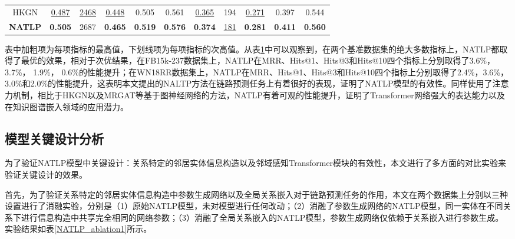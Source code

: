 \begin{table}[htbp]
\begin{center}
\begin{tabular}{*{11}{c}}
          HKGN&\underline{0.487}&\underline{2468}&\underline{0.448}&0.505&0.561&\underline{0.365}&194&\underline{0.271}&0.397&0.544\\
          \cmidrule{1-11}
          \textbf{NATLP}&\textbf{0.505}&2687&\textbf{0.465}&\textbf{0.519}&\textbf{0.576}&\textbf{0.374}&\underline{181}&\textbf{0.281}&\textbf{0.411}&\textbf{0.560}\\
          \bottomrule
      \end{tabular}
      \label{NATLP_result_tab}
  \end{center}
\end{table}

表中加粗项为每项指标的最高值，下划线项为每项指标的次高值。从表\ref{NATLP_result_tab}中可以观察到，在两个基准数据集的绝大多数指标上，NATLP都取得了最优的效果，相对于次优结果，在FB15k-237数据集上，NATLP在MRR、Hits@1、Hits@3和Hits@10四个指标上分别取得了3.6\%，3.7\%， 1.9\%， 0.6\%的性能提升；在WN18RR数据集上，NATLP在MRR、Hits@1、Hits@3和Hits@10四个指标上分别取得了2.4\%，3.6\%， 3.0\%和2.0\%的性能提升，这表明本文提出的NALTP方法在链路预测任务上有着很好的表现，证明了NATLP模型的有效性。同样使用了注意力机制，相比于HKGN以及MRGAT等基于图神经网络的方法，NATLP有着可观的性能提升，证明了Transformer网络强大的表达能力以及在知识图谱嵌入领域的应用潜力。

\subsection{模型关键设计分析}

为了验证NATLP模型中关键设计：关系特定的邻居实体信息构造以及邻域感知Transformer模块的有效性，本文进行了多方面的对比实验来验证关键设计的效果。

首先，为了验证关系特定的邻居实体信息构造中参数生成网络以及全局关系嵌入对于链路预测任务的作用，本文在两个数据集上分别以三种设置进行了消融实验，分别是（1）原始NATLP模型，未对模型进行任何改动；（2）消融了参数生成网络的NATLP模型，同一实体在不同关系下进行信息构造中共享完全相同的网络参数；（3）消融了全局关系嵌入的NATLP模型，参数生成网络仅依赖于关系嵌入进行参数生成。实验结果如表\ref{NATLP_ablation1}所示。

